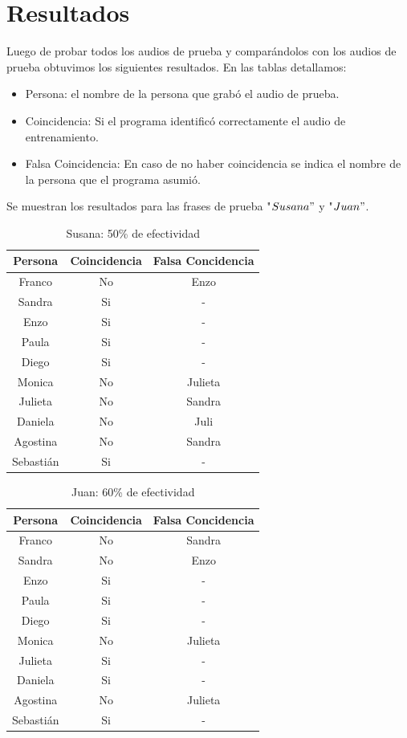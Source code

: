 \documentclass[a4paper,10pt]{article}
\begin{document}
\section{Resultados}
Luego de probar todos los audios de prueba y comparándolos con los audios de prueba obtuvimos los siguientes resultados. En las tablas detallamos:
\begin{itemize}
\item Persona: el nombre de la persona que grabó el audio de prueba.
\item Coincidencia: Si el programa identificó correctamente el audio de entrenamiento.
\item Falsa Coincidencia: En caso de no haber coincidencia se indica el nombre de la persona que el programa asumió.
\end{itemize}
Se muestran los resultados para las frases de prueba "$Susana"$ y "$Juan"$.
\begin{center}
\begin{table}[h]
\centering
\begin{tabular}{ccc}
\hline
\textbf{Persona} & \textbf{Coincidencia} & \textbf{Falsa Concidencia} \\ \hline
Franco&No&Enzo\\
Sandra&Si&-\\
Enzo&Si&-\\     
Paula&Si&-\\     
Diego&Si&-\\ 
Monica&No&Julieta\\
Julieta&No&Sandra\\
Daniela&No&Juli\\
Agostina&No&Sandra\\
Sebastián&Si&-\\
\end{tabular}
\caption[Texto del índice (opcional)]{Susana: 50\% de efectividad}
\end{table}
\end{center}

\begin{center}
\begin{table}[h]
\centering
\begin{tabular}{ccc}
\hline
\textbf{Persona} & \textbf{Coincidencia} & \textbf{Falsa Concidencia} \\ \hline
Franco&No&Sandra\\
Sandra&No&Enzo\\
Enzo&Si&-\\     
Paula&Si&-\\     
Diego&Si&-\\ 
Monica&No&Julieta\\
Julieta&Si&-\\
Daniela&Si&-\\
Agostina&No&Julieta\\
Sebastián&Si&-\\
\end{tabular}
\caption[Texto del índice (opcional)]{Juan: 60\% de efectividad}
\end{table}
\end{center}
\end{document}
